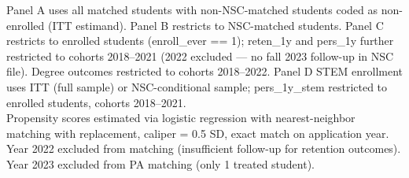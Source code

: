 \begin{table}[t]
\begin{minipage}{\linewidth}
Panel A uses all matched students with non-NSC-matched students coded as non-enrolled (ITT estimand). Panel B restricts to NSC-matched students. Panel C restricts to enrolled students (enroll\_ever == 1); reten\_1y and pers\_1y further restricted to cohorts 2018--2021 (2022 excluded --- no fall 2023 follow-up in NSC file). Degree outcomes restricted to cohorts 2018--2022. Panel D STEM enrollment uses ITT (full sample) or NSC-conditional sample; pers\_1y\_stem restricted to enrolled students, cohorts 2018--2021.\\
Propensity scores estimated via logistic regression with nearest-neighbor matching with replacement, caliper = 0.5 SD, exact match on application year. Year 2022 excluded from matching (insufficient follow-up for retention outcomes). Year 2023 excluded from PA matching (only 1 treated student).\\
\end{minipage}
\end{table}

